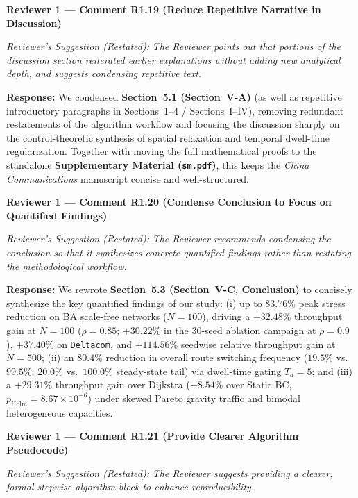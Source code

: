 \documentclass[11pt,a4paper]{article}
\newcommand{\cbox}[2]{%
  \vspace{0.6em}\noindent\textbf{#1}\par\smallskip
  \noindent\textit{Reviewer's Suggestion (Restated):} \textit{#2}\par\smallskip
}
\begin{document}
\hrulefill

\cbox{Reviewer 1 --- Comment R1.19 (Reduce Repetitive Narrative in Discussion)}{The Reviewer points out that portions of the discussion section reiterated earlier explanations without adding new analytical depth, and suggests condensing repetitive text.}

\noindent\textbf{Response:} We condensed \textbf{Section~5.1 (Section~V-A)} (as well as repetitive introductory paragraphs in Sections~1--4 / Sections~I--IV), removing redundant restatements of the algorithm workflow and focusing the discussion sharply on the control-theoretic synthesis of spatial relaxation and temporal dwell-time regularization. Together with moving the full mathematical proofs to the standalone \textbf{Supplementary Material (\texttt{sm.pdf})}, this keeps the \textit{China Communications} manuscript concise and well-structured.

\hrulefill

\cbox{Reviewer 1 --- Comment R1.20 (Condense Conclusion to Focus on Quantified Findings)}{The Reviewer recommends condensing the conclusion so that it synthesizes concrete quantified findings rather than restating the methodological workflow.}

\noindent\textbf{Response:} We rewrote \textbf{Section~5.3 (Section~V-C, Conclusion)} to concisely synthesize the key quantified findings of our study: (i) up to $83.76\%$ peak stress reduction on BA scale-free networks ($N=100$), driving a $+32.48\%$ throughput gain at $N=100$ ($\rho=0.85$; $+30.22\%$ in the 30-seed ablation campaign at $\rho=0.9$), $+37.40\%$ on \texttt{Deltacom}, and $+114.56\%$ seedwise relative throughput gain at $N=500$; (ii) an $80.4\%$ reduction in overall route switching frequency ($19.5\%$ vs.\ $99.5\%$; $20.0\%$ vs.\ $100.0\%$ steady-state tail) via dwell-time gating $T_d=5$; and (iii) a $+29.31\%$ throughput gain over Dijkstra ($+8.54\%$ over Static BC, $p_{\text{Holm}}=8.67 \times 10^{-6}$) under skewed Pareto gravity traffic and bimodal heterogeneous capacities.

\hrulefill

\cbox{Reviewer 1 --- Comment R1.21 (Provide Clearer Algorithm Pseudocode)}{The Reviewer suggests providing a clearer, formal stepwise algorithm block to enhance reproducibility.}
\end{document}
